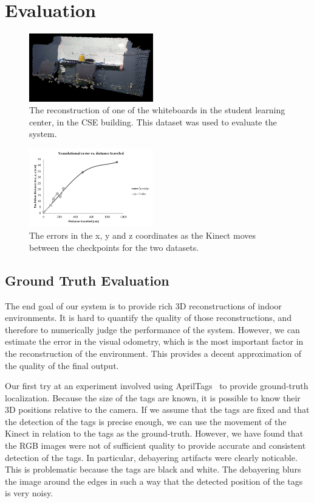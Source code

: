 \documentclass[letterpaper, 10pt, conference]{ieeeconf}
\begin{document}
\section{Evaluation}
\begin{figure}[t]
\centering
\includegraphics[width=0.48\textwidth]{figures/cropped_gt_slc.png}
\caption{The reconstruction of one of the whiteboards in the student learning center,
in the CSE building. This dataset was used to evaluate the system.}
\label{fig:gt-slc}
\end{figure}

\begin{figure}[t]
\centering
\includegraphics[width=0.48\textwidth]{figures/gt_translational.pdf}
\caption{The errors in the x, y and z coordinates as the Kinect moves between the checkpoints
for the two datasets.}
\label{fig:plot-trans}
\end{figure}

\subsection{Ground Truth Evaluation}
The end goal of our system is to provide rich 3D reconstructions of indoor environments.
It is hard to quantify the quality of those reconstructions, and therefore to numerically
judge the performance of the system. However, we can estimate the error in the visual odometry,
which is the most important factor in the reconstruction of the environment. This provides
a decent approximation of the quality of the final output.

Our first try at an experiment involved using AprilTags~\cite{olson2011tags} to
provide ground-truth localization. Because the size of the tags are known, it is
possible to know their 3D positions relative to the camera. If we assume that the tags are fixed and that
the detection of the tags is precise enough, we can use the movement of the
Kinect in relation to the tags as the ground-truth. However, we have found that
the RGB images were not of sufficient quality to provide accurate and consistent
detection of the tags. In particular, debayering artifacts were clearly noticable.
This is problematic because the tags are black and white. The debayering blurs the
image around the edges in such a way that the detected position of the tags is very noisy.
\end{document}
